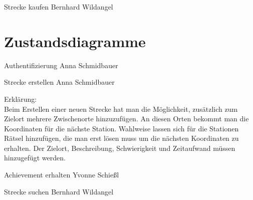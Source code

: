 \documentclass[a4paper, 12pt]{article}
\begin{document}
{\Large Strecke kaufen}
Bernhard Wildangel
\begin{figure}[H] 
\centering
\end{figure}

\newpage
\section{Zustandsdiagramme}

{\Large Authentifizierung}
Anna Schmidbauer
\begin{figure}[H] 
\centering
\end{figure}
\newpage

{\Large Strecke erstellen}
Anna Schmidbauer
\begin{figure}[H] 
\centering
\end{figure}

Erklärung:\\
Beim Erstellen einer neuen Strecke hat man die Möglichkeit, zusätzlich zum Zielort mehrere Zwischenorte hinzuzufügen. An diesen Orten bekommt man die Koordinaten für die nächste Station. Wahlweise lassen sich für die Stationen Rätsel hinzufügen, die man erst lösen muss um die nächsten Koordinaten zu erhalten. Der Zielort, Beschreibung, Schwierigkeit und Zeitaufwand müssen hinzugefügt werden.\\
\newpage

{\Large Achievement erhalten}
Yvonne Schießl
\begin{figure}[H] 
\centering
\end{figure}
\newpage

{\Large Strecke suchen}
Bernhard Wildangel
\begin{figure}[H] 
\centering
\end{figure}
\end{document}
